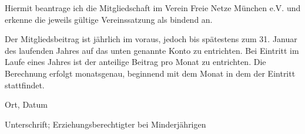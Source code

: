 \Large{
    \noindent Hiermit beantrage ich die Mitgliedschaft im Verein Freie Netze München e.V. und erkenne die jeweils
gültige Vereinssatzung als bindend an. \par\noindent
Der Mitgliedsbeitrag ist jährlich im voraus, jedoch bis spätestens zum 31.
Januar des laufenden Jahres auf das unten genannte Konto zu entrichten. Bei
Eintritt im Laufe eines Jahres ist der anteilige Beitrag pro Monat zu entrichten.
Die Berechnung erfolgt monatsgenau, beginnend mit dem Monat in dem der
Eintritt stattfindet.}
\vspace{1.5cm}

\begin{minipage}{0.4\textwidth}
        \begin{Form}
        \underline{\TextField[name=date,charsize = 14pt,width=0.8\linewidth,bordercolor={}]{}}
        \end{Form}\par\noindent
        \small{ Ort, Datum}


    \end{minipage}
    \begin{minipage}{0.8\textwidth}

           \begin{Form}
            \underline{\TextField[name=unterschrift,charsize = 14pt,width=0.7\linewidth,bordercolor={}]{}}
            \end{Form}\par\noindent
\small{Unterschrift; Erziehungsberechtigter bei Minderjährigen   } \end{minipage}




   